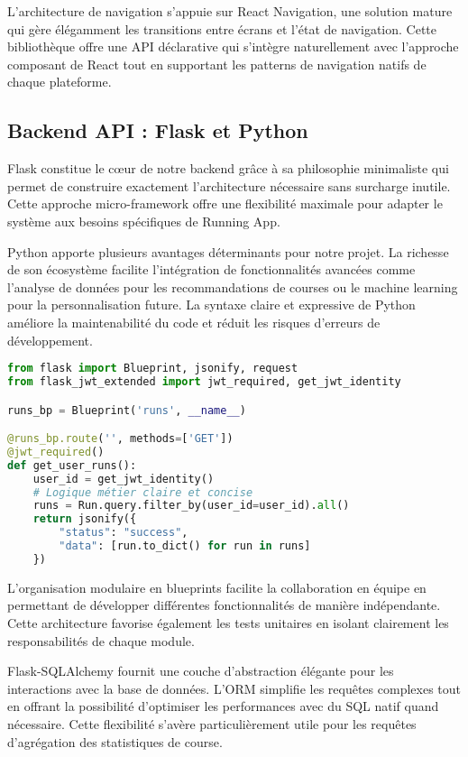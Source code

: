 L'architecture de navigation s'appuie sur React Navigation, une solution mature qui gère élégamment les transitions entre écrans et l'état de navigation. Cette bibliothèque offre une API déclarative qui s'intègre naturellement avec l'approche composant de React tout en supportant les patterns de navigation natifs de chaque plateforme.

\subsection{Backend API : Flask et Python}

Flask constitue le cœur de notre backend grâce à sa philosophie minimaliste qui permet de construire exactement l'architecture nécessaire sans surcharge inutile. Cette approche micro-framework offre une flexibilité maximale pour adapter le système aux besoins spécifiques de Running App.

Python apporte plusieurs avantages déterminants pour notre projet. La richesse de son écosystème facilite l'intégration de fonctionnalités avancées comme l'analyse de données pour les recommandations de courses ou le machine learning pour la personnalisation future. La syntaxe claire et expressive de Python améliore la maintenabilité du code et réduit les risques d'erreurs de développement.

\begin{lstlisting}[language=python, caption=Exemple de structure Blueprint Flask]
from flask import Blueprint, jsonify, request
from flask_jwt_extended import jwt_required, get_jwt_identity

runs_bp = Blueprint('runs', __name__)

@runs_bp.route('', methods=['GET'])
@jwt_required()
def get_user_runs():
    user_id = get_jwt_identity()
    # Logique métier claire et concise
    runs = Run.query.filter_by(user_id=user_id).all()
    return jsonify({
        "status": "success",
        "data": [run.to_dict() for run in runs]
    })
\end{lstlisting}

L'organisation modulaire en blueprints facilite la collaboration en équipe en permettant de développer différentes fonctionnalités de manière indépendante. Cette architecture favorise également les tests unitaires en isolant clairement les responsabilités de chaque module.

Flask-SQLAlchemy fournit une couche d'abstraction élégante pour les interactions avec la base de données. L'ORM simplifie les requêtes complexes tout en offrant la possibilité d'optimiser les performances avec du SQL natif quand nécessaire. Cette flexibilité s'avère particulièrement utile pour les requêtes d'agrégation des statistiques de course.

